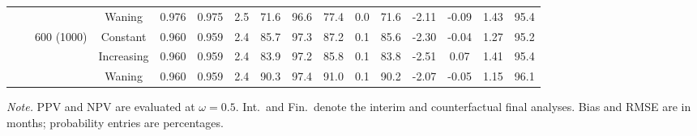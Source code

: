 \begin{table}[!htbp]
{\begin{tabular}[t]{cccccccccccccccc}
 &  &  & Waning & 0.976 & 0.975 & 2.5 & 71.6 & 96.6 & 77.4 & 0.0 & 71.6 & -2.11 & -0.09 & 1.43 & 95.4\\
\cmidrule(l{3pt}r{3pt}){3-3} \cmidrule(l{3pt}r{3pt}){4-4} \cmidrule(l{3pt}r{3pt}){5-6} \cmidrule(l{3pt}r{3pt}){7-10} \cmidrule(l{3pt}r{3pt}){11-12} \cmidrule(l{3pt}r{3pt}){13-16}
 &  & 600 (1000) & Constant & 0.960 & 0.959 & 2.4 & 85.7 & 97.3 & 87.2 & 0.1 & 85.6 & -2.30 & -0.04 & 1.27 & 95.2\\
 &  &  & Increasing & 0.960 & 0.959 & 2.4 & 83.9 & 97.2 & 85.8 & 0.1 & 83.8 & -2.51 & 0.07 & 1.41 & 95.4\\
 &  &  & Waning & 0.960 & 0.959 & 2.4 & 90.3 & 97.4 & 91.0 & 0.1 & 90.2 & -2.07 & -0.05 & 1.15 & 96.1\\
\bottomrule
\end{tabular}}
\par\vspace{2pt}
\begin{minipage}{\linewidth}
\footnotesize\raggedright
\textit{Note.} PPV and NPV are evaluated at $\omega=0.5$. Int.\ and Fin.\ denote the interim and counterfactual final analyses. Bias and RMSE are in months; probability entries are percentages.
\end{minipage}
\end{table}
